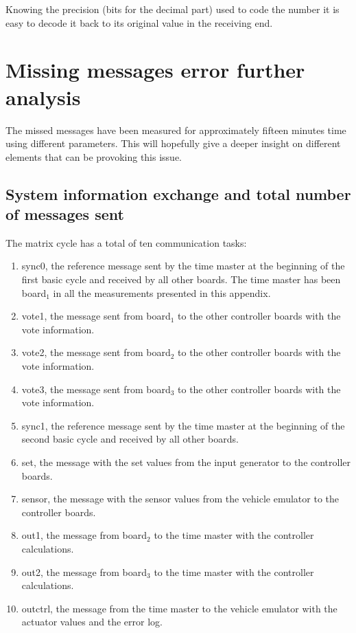 \documentclass[table,xcdraw]{article}
\begin{document}
Knowing the precision (bits for the decimal part) used to code the number it is easy to decode it back to its original value in the receiving end.

\newpage
\section{Missing messages error further analysis}\label{app:missing_msgs}
The missed messages have been measured for approximately fifteen minutes time using different parameters. This will hopefully give a deeper insight on different elements that can be provoking this issue.

\subsection{System information exchange and total number of messages sent}
The matrix cycle has a total of ten communication tasks:
\begin{enumerate}
    \item sync0, the reference message sent by the time master at the beginning of the first basic cycle and received by all other boards. The time master has been board$_1$ in all the measurements presented in this appendix.
    \item vote1, the message sent from board$_1$ to the other controller boards with the vote information.
    \item vote2, the message sent from board$_2$ to the other controller boards with the vote information.
    \item vote3, the message sent from board$_3$ to the other controller boards with the vote information.
    \item sync1, the reference message sent by the time master at the beginning of the second basic cycle and received by all other boards.
    \item set, the message with the set values from the input generator to the controller boards.
    \item sensor, the message with the sensor values from the vehicle emulator to the controller boards.
    \item out1, the message from board$_2$ to the time master with the controller calculations.
    \item out2, the message from board$_3$ to the time master with the controller calculations.
    \item outctrl, the message from the time master to the vehicle emulator with the actuator values and the error log.
\end{enumerate}
\end{document}
